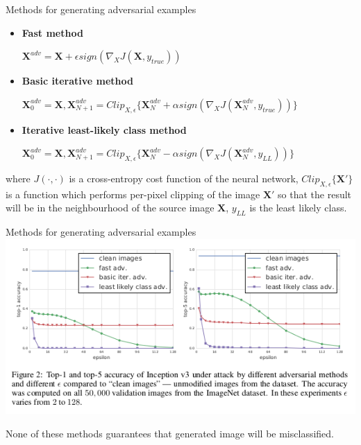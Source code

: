 \documentclass[15pt]{beamer}
\begin{document}
\begin{frame}{Methods for generating adversarial examples}
 \begin{itemize}
 \item \textbf{Fast method}
 \vskip0.1in
 \begin{center}
 $\textbf{X}^{adv} = \textbf{X} + \epsilon sign(\nabla_XJ(\textbf{X}, y_{true}))$
 \end{center}
 \item \textbf{Basic iterative method}
 \vskip0.1in
 \begin{center}
 $\textbf{X}^{adv}_0 = \textbf{X}, \textbf{X}^{adv}_{N+1} = Clip_{X, \epsilon}\{\textbf{X}^{adv}_N + \alpha sign(\nabla_XJ(\textbf{X}^{adv}_N, y_{true}))\}$
 \end{center}
 \item \textbf{Iterative least-likely class method}
 \vskip0.1in
 \begin{center}
 $\textbf{X}^{adv}_0 = \textbf{X}, \textbf{X}^{adv}_{N+1} = Clip_{X, \epsilon}\{\textbf{X}^{adv}_N - \alpha sign(\nabla_XJ(\textbf{X}^{adv}_N, y_{LL}))\}$
 \end{center}
 \end{itemize}

  \vskip0.1in
  where $J(\cdot, \cdot)$ is a cross-entropy cost function of the neural network, $Clip_{X, \epsilon}\{\textbf{X}'\}$ is a function which performs per-pixel clipping of the image $\textbf{X}'$ so that the result will be in the neighbourhood of the source image $\textbf{X}$, $y_{LL}$ is the least likely class.
\end{frame}

\begin{frame}{Methods for generating adversarial examples}
  \centering
  \includegraphics[width=\linewidth]{fig2.png}
  
  \raggedright
  None of these methods guarantees that generated image will be misclassified.
\end{frame}
\end{document}
